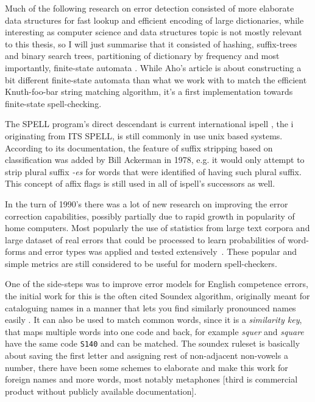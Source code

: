 \documentclass[officiallayout,draft]{unihelcompling}
\begin{document}
Much of the following research on error detection consisted of more elaborate
data structures for fast lookup and efficient encoding of large dictionaries,
while interesting as computer science and data structures topic is not mostly
relevant to this thesis, so I will just summarise that it consisted of hashing,
suffix-trees and binary search trees, partitioning of dictionary by frequency
\cite{knuth1973art} and most importantly, finite-state automata
\cite{aho1975efficient}. While Aho's article is about constructing a bit
different finite-state automata than what we work with to match the
efficient Knuth-foo-bar string matching algorithm, it's
a first implementation towards finite-state spell-checking.

The SPELL program's direct descendant is current international ispell
\cite{gorin1971spell}, the i originating from ITS SPELL, is still commonly in
use unix based systems. According to its documentation, the feature of suffix
stripping based on classification was added by Bill Ackerman in 1978, e.g. it
would only attempt to strip plural suffix \emph{-es} for words that were
identified of having such plural suffix.  This concept of affix flags is still
used in all of ispell's successors as well.

In the turn of 1990's there was a lot of new research on improving the error
correction capabilities, possibly partially due to rapid growth in popularity
of home computers. Most popularly the use of statistics from large text corpora
and large dataset of real errors that could be processed to learn probabilities
of word-forms and error types was applied and tested
extensively~\cite{kernighan1990spelling,church1991probability}. These popular
and simple metrics are still considered to be useful for modern spell-checkers.

One of the side-steps was to improve error models for English competence
errors, the initial work for this is the often cited Soundex algorithm,
originally meant for cataloguing names in a manner that lets you find similarly
pronounced names easily \cite{russell1918soundex}. It can also be used to match
common words, since it is a \emph{similarity key}, that maps multiple words
into one code and back, for example \emph{squer} and \emph{square} have the
same code \texttt{S140} and can be matched. The soundex ruleset is basically
about saving the first letter and assigning rest of non-adjacent non-vowels a
number, there have been some schemes to elaborate and make this work for
foreign names and more words, most notably metaphones
\cite{philips1990hanging,philips2000double}[third is commercial product without
publicly available documentation].
\end{document}
